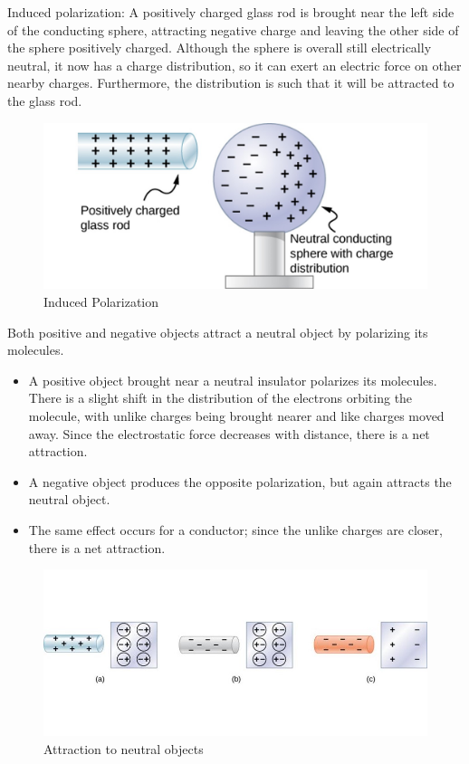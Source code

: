 \documentclass[14pt]{memoir}
\begin{document}
Induced polarization: A positively charged glass rod is brought near the left side of the conducting sphere, attracting negative charge and leaving the other side of the sphere positively charged. Although the sphere is overall still electrically neutral, it now has a charge distribution, so it can exert an electric force on other nearby charges. Furthermore, the distribution is such that it will be attracted to the glass rod.


\begin{figure}[h]
\begin{center}
\includegraphics[scale=0.40]{fig/fig_05_10.jpg}
\caption{Induced Polarization}
\label{fig:05_10}
\end{center}
\end{figure}

Both positive and negative objects attract a neutral object by polarizing its molecules.
\begin{itemize}
\item A positive object brought near a neutral insulator polarizes its molecules. There is a slight shift in the distribution of the electrons orbiting the molecule, with unlike charges being brought nearer and like charges moved away. Since the electrostatic force decreases with distance, there is a net attraction.
\item  A negative object produces the opposite polarization, but again attracts the neutral object. 
\item The same effect occurs for a conductor; since the unlike charges are closer, there is a net attraction.
\end{itemize}

\begin{figure}[h]
\begin{center}
\includegraphics[scale=0.60]{fig/fig_05_11.jpg}
\caption{Attraction to neutral objects}
\label{fig:05_11}
\end{center}
\end{figure}
\end{document}
